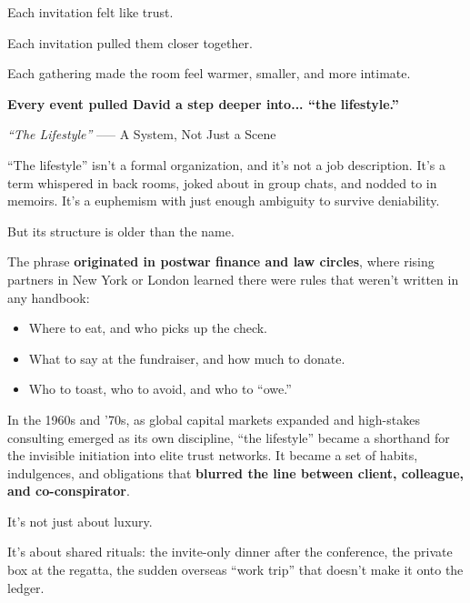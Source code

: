 Each invitation felt like trust.

Each invitation pulled them closer together. 

Each gathering made the room feel warmer, smaller, and more intimate.  

\textbf{Every event pulled David a step deeper into... ``the lifestyle.''}

\medskip

\begin{HistoricalSidebar}{\textit{“The Lifestyle”} --— A System, Not Just a Scene}

  “The lifestyle” isn’t a formal organization, and it’s not a job description. It’s a term whispered in 
  back rooms, joked about in group chats, and nodded to in memoirs. It's a euphemism with just enough 
  ambiguity to survive deniability.

  \medskip
  
  But its structure is older than the name.
  
  \medskip
  
  The phrase \textbf{originated in postwar finance and law circles}, where rising partners in New York 
  or London learned there were rules that weren’t written in any handbook:

  \medskip
  
  \begin{itemize}
    \item Where to eat, and who picks up the check.
    \item What to say at the fundraiser, and how much to donate.
    \item Who to toast, who to avoid, and who to “owe.”
  \end{itemize}

  \medskip
  
  In the 1960s and ’70s, as global capital markets expanded and high-stakes consulting emerged as its own discipline, 
  “the lifestyle” became a shorthand for the invisible initiation into elite trust networks. It became a set of habits, 
  indulgences, and obligations that \textbf{blurred the line between client, colleague, and co-conspirator}.
  
  \medskip
  
  It’s not just about luxury.

  \medskip
  
  It’s about shared rituals: the invite-only dinner after the conference, the private box at the regatta, the sudden 
  overseas “work trip” that doesn’t make it onto the ledger.
  

\end{HistoricalSidebar}
